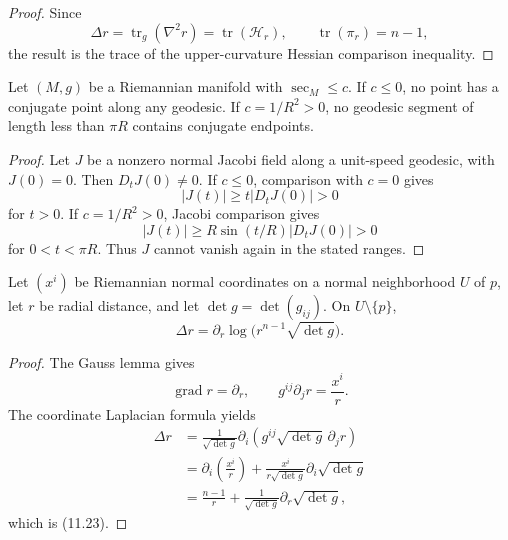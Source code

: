 \begin{proof}
\sketch Since
\[
\Delta r=\operatorname{tr}_g(\nabla^2r)=\operatorname{tr}(\mathcal H_r),
\qquad \operatorname{tr}(\pi_r)=n-1,
\]
the result is the trace of the upper-curvature Hessian comparison inequality.
\end{proof}

\begin{theorem}
\label{thm:conjugate-point-comparison-I}
\leanok
Let $(M,g)$ be a Riemannian manifold with $\sec_M\leq c$. If $c\leq0$, no
point has a conjugate point along any geodesic. If $c=1/R^2>0$, no geodesic
segment of length less than $\pi R$ contains conjugate endpoints.

\begin{proof}
\sketch Let $J$ be a nonzero normal Jacobi field along a unit-speed geodesic,
with $J(0)=0$. Then $D_tJ(0)\ne0$. If $c\leq0$, comparison with $c=0$ gives
\[
|J(t)|\geq t|D_tJ(0)|>0
\]
for $t>0$. If $c=1/R^2>0$, Jacobi comparison gives
\[
|J(t)|\geq R\sin(t/R)|D_tJ(0)|>0
\]
for $0<t<\pi R$. Thus $J$ cannot vanish again in the stated ranges.
\end{proof}
\end{theorem}

\begin{lemma}
\label{lem:riemannian-volume-laplacian}
Let $(x^i)$ be Riemannian normal coordinates on a normal neighborhood $U$ of
$p$, let $r$ be radial distance, and let $\det g=\det(g_{ij})$. On
$U\setminus\{p\}$,
\begin{equation}
\Delta r=\partial_r\log\bigl(r^{n-1}\sqrt{\det g}\bigr). \tag{11.23}
\end{equation}

\begin{proof}
\sketch The Gauss lemma gives
\[
\operatorname{grad}r=\partial_r,
\qquad
g^{ij}\partial_jr=\frac{x^i}{r}.
\]
The coordinate Laplacian formula yields
\begin{align*}
\Delta r
&=\frac1{\sqrt{\det g}}
  \partial_i\left(g^{ij}\sqrt{\det g}\,\partial_jr\right)\\
&=\partial_i\left(\frac{x^i}{r}\right)
  +\frac{x^i}{r\sqrt{\det g}}\partial_i\sqrt{\det g}\\
&=\frac{n-1}{r}
  +\frac1{\sqrt{\det g}}\partial_r\sqrt{\det g},
\end{align*}
which is (11.23).
\end{proof}
\end{lemma}

